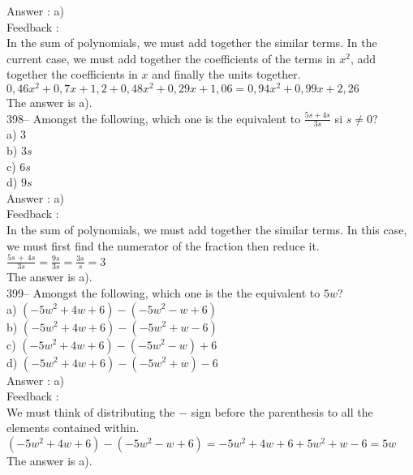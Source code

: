 \documentclass[letterpaper, 12pt]{article}
\begin{document}
Answer : a) \\

Feedback : \\
In the sum of polynomials, we must add together the similar terms. In the current case, we must add together the coefficients of the terms in $x^{2}$, add together the coefficients in $x$ and finally the units together.\\
$0,46x^{2}+0,7x+1,2+0,48x^{2}+0,29x+1,06=0,94x^{2}+0,99x+2,26$\\
The answer is a).\\

398-- Amongst the following, which one is the equivalent to
$\frac{5s+4s}{3s}$ si $s\neq0$?\\
a) 3\\
b) $3s$\\
c) $6s$\\
d) $9s$\\

Answer : a)\\

Feedback : \\
In the sum of polynomials, we must add together the similar terms. In this case, we must first find the numerator of the fraction then reduce it.\\[2mm]
$\frac{5s\,+\,4s}{3s}=\frac{9s}{3s}=\frac{3s}{s}=3$\\[2mm]
The answer is a).\\

399-- Amongst the following, which one is the the equivalent to $5w$?\\
a) $\left( -5w^{2}+4w+6\right) -\left( -5w^{2}-w+6\right) $\\
b) $\left( -5w^{2}+4w+6\right) -\left( -5w^{2}+w-6\right) $\\
c) $\left( -5w^{2}+4w+6\right) -\left( -5w^{2}-w\right) +6 $\\
d) $\left( -5w^{2}+4w+6\right) -\left( -5w^{2}+w\right) -6$\\

Answer : a)\\

Feedback : \\
We must think of distributing the $-$ sign before the parenthesis to all the elements contained within.\\
$\left( -5w^{2}+4w+6\right) -\left(
-5w^{2}-w+6\right)=-5w^{2}+4w+6+5w^{2}+w-6=5w $\\
The answer is a).\\
\end{document}
